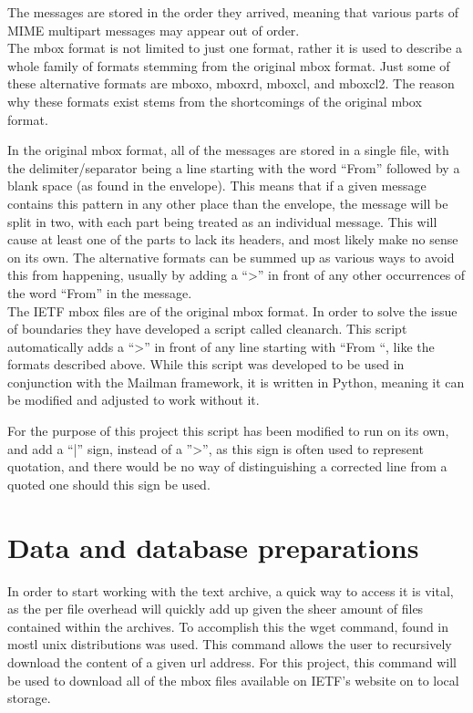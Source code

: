 \documentclass[a4paper,english]{report}
\begin{document}
The messages are stored in the order they arrived, meaning that various parts of  MIME multipart messages may appear out of order.\\

\noindent
The mbox format is not limited to just one format, rather it is used to describe a whole family of formats stemming from the original mbox format. 
Just some of these alternative formats are mboxo, mboxrd, mboxcl, and mboxcl2.
The reason why these formats exist stems from the shortcomings of the original mbox format.

In the original mbox format, all of the messages are stored in a single file, with the delimiter/separator being a line starting with the word “From” followed by a blank space (as found in the envelope). 
This means that if a given message contains this pattern in any other place than the envelope, the message will be split in two, with each part being treated as an individual message. This will cause at least one of the parts to lack its headers, and most likely make no sense on its own.
The alternative formats can be summed up as various ways to avoid this from happening, usually by adding a “>” in front of any other occurrences of the word “From” in the message.\\

The IETF mbox files are of the original mbox format. In order to solve the issue of boundaries they have developed a script called cleanarch. This script automatically adds a “>” in front of any line starting with “From “, like the formats described above. While this script was developed to be used in conjunction with the Mailman framework, it is written in Python, meaning it can be modified and adjusted to work without it.

For the purpose of this project this script has been modified to run on its own, and add a “|” sign, instead of a ''>'', as this sign is often used to represent quotation, and there would be no way of distinguishing a corrected line from a quoted one should this sign be used.





\chapter{Data and database preparations}



In order to start working with the text archive, a quick way to access it is vital, as the per file overhead will quickly add up given the sheer amount of files contained within the archives.
To accomplish this the wget command, found in mostl unix distributions was used. This command allows the user to recursively download the content of a given url address. For this project, this command will be used to download all of the mbox files available on IETF's website on to local storage.\\\\
\end{document}
